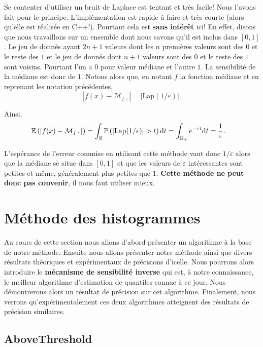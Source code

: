 Se contenter d'utiliser un bruit de {\sc Laplace} est tentant et très facile! Nous l'avons fait pour le principe. L'implémentation est rapide à faire et très courte (alors qu'elle est réalisée en C++!). Pourtant cela est \textbf{sans intérêt} ici! En effet, disons que nous travaillons sur un ensemble dont nous savons qu'il est inclus dans \([0,1]\). Le jeu de donnés ayant \(2n + 1\) valeurs dont les \(n\) premières valeurs sont des \(0\) et le reste des \(1\) et le jeu de donnés dont \(n+1\) valeurs sont des \(0\) et le reste des \(1\) sont voisins. Pourtant l'un a \(0\) pour valeur médiane et l'autre \(1\). La sensibilité de la médiane est donc de \(1\). Notons alors que, en notant \(f\) la fonction médiane et en reprenant les notation précédentes, 
\[
    |f(x) - \mathcal M_{f, \varepsilon}| = |\text{Lap}(1/\varepsilon)|.    
\]

Ainsi,
\begin{align*}
    \mathbb E\left( |f(x) - \mathcal M_{f, \varepsilon}| \right) & = \int_{\mathbb{R}} \mathbb P \left( |\text{Lap}(1/\varepsilon)| > t \right) \mathrm{d} t = \int_{\mathbb{R}_+} e^{-\varepsilon t}  \mathrm{d} t = \dfrac{1}{\varepsilon}.
\end{align*}

L'espérance de l'erreur commise en utilisant cette méthode vaut donc \(1/\varepsilon\) alors que la médiane se situe dans \([0,1]\) et que les valeurs de \(\varepsilon\) intéressantes sont petites et même, généralement plus petites que \(1\). \textbf{Cette méthode ne peut donc pas convenir}, il nous faut utiliser mieux.\\




\section{Méthode des histogrammes}

Au cours de cette section nous allons d'abord présenter un algorithme à la base de notre méthode. Ensuite nous allons présenter notre méthode ainsi que divers résultats théoriques et expérimentaux de précisions d'icelle. Nous pourrons alors introduire le \textbf{mécanisme de sensibilité inverse} qui est, à notre connaissance, le meilleur algorithme d'estimation de quantiles connue à ce jour. Nous démontrerons alors un résultat de précision sur cet algorithme. Finalement, nous verrons qu'expérimentalement ces deux algorithmes atteignent des résultats de précision similaires.

\subsection{AboveThreshold}

